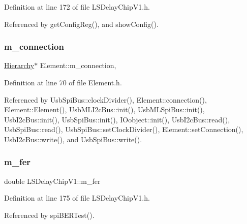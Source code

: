 Definition at line 172 of file L\+S\+Delay\+Chip\+V1.\+h.



Referenced by get\+Config\+Reg(), and show\+Config().

\mbox{\label{classElement_abe3de7a5dbbc9a6dd2d7e012e5fdb266}} 
\subsubsection{\texorpdfstring{m\+\_\+connection}{m\_connection}}
{\footnotesize\ttfamily \hyperlink{classHierarchy}{Hierarchy}$\ast$ Element\+::m\+\_\+connection\hspace{0.3cm}{\ttfamily [protected]}, {\ttfamily [inherited]}}



Definition at line 70 of file Element.\+h.



Referenced by Usb\+Spi\+Bus\+::clock\+Divider(), Element\+::connection(), Element\+::\+Element(), Usb\+M\+L\+I2c\+Bus\+::init(), Usb\+M\+L\+Spi\+Bus\+::init(), Usb\+I2c\+Bus\+::init(), Usb\+Spi\+Bus\+::init(), I\+Oobject\+::init(), Usb\+I2c\+Bus\+::read(), Usb\+Spi\+Bus\+::read(), Usb\+Spi\+Bus\+::set\+Clock\+Divider(), Element\+::set\+Connection(), Usb\+I2c\+Bus\+::write(), and Usb\+Spi\+Bus\+::write().

\mbox{\label{classLSDelayChipV1_a38d35de6a25fb1394ede2f39a4f25a08}} 
\subsubsection{\texorpdfstring{m\+\_\+fer}{m\_fer}}
{\footnotesize\ttfamily double L\+S\+Delay\+Chip\+V1\+::m\+\_\+fer\hspace{0.3cm}{\ttfamily [private]}}



Definition at line 175 of file L\+S\+Delay\+Chip\+V1.\+h.



Referenced by spi\+B\+E\+R\+Test().

\mbox{\label{classLSDelayChipV1_a425c69ef8f3d64d93cb1c86b83bbceec}} 

